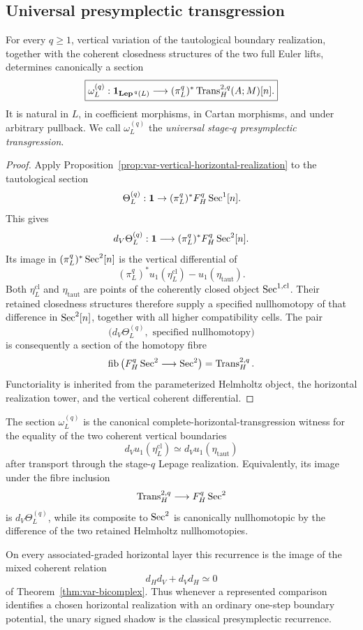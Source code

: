 \subsection{Universal presymplectic transgression}

\begin{theorem}
\label{thm:var-universal-presymplectic}
For every \(q\ge1\), vertical variation of the tautological boundary realization, together with the coherent closedness structures of the two full Euler lifts, determines canonically a section
\[
    \boxed{
    \omega_L^{(q)}:
    \mathbf 1_{\mathbf{Lep}^{\,q}(L)}
    \longrightarrow
    (\pi_L^q)^*\operatorname{Trans}_{H}^{2,q}(A;M)[n].
    }
\]
It is natural in \(L\), in coefficient morphisms, in Cartan morphisms, and under arbitrary pullback.  We call \(\omega_L^{(q)}\) the \emph{universal stage-\(q\) presymplectic transgression}.
\end{theorem}

\begin{proof}
Apply Proposition~\ref{prop:var-vertical-horizontal-realization} to the tautological section
\[
    \Theta_L^{(q)}:
    \mathbf 1\to
    (\pi_L^q)^*F_H^q\operatorname{Sec}^1[n].
\]
This gives
\[
    d_V\Theta_L^{(q)}:
    \mathbf 1\longrightarrow
    (\pi_L^q)^*F_H^q\operatorname{Sec}^2[n].
\]
Its image in \((\pi_L^q)^*\operatorname{Sec}^2[n]\) is the vertical differential of
\[
    (\pi_L^q)^*u_1(\eta_L^{\mathrm{cl}})
    -
    u_1(\eta_{\mathrm{taut}}).
\]
Both \(\eta_L^{\mathrm{cl}}\) and \(\eta_{\mathrm{taut}}\) are points of the coherently closed object \(\operatorname{Sec}^{1,\mathrm{cl}}\).  Their retained closedness structures therefore supply a specified nullhomotopy of that difference in \(\operatorname{Sec}^2[n]\), together with all higher compatibility cells.  The pair
\[
    \bigl(d_V\Theta_L^{(q)},\text{ specified nullhomotopy}\bigr)
\]
is consequently a section of the homotopy fibre
\[
    \operatorname{fib}\left(
      F_H^q\operatorname{Sec}^2\longrightarrow\operatorname{Sec}^2
    \right)
    =
    \operatorname{Trans}_{H}^{2,q}.
\]
Functoriality is inherited from the parameterized Helmholtz object, the horizontal realization tower, and the vertical coherent differential.
\end{proof}

\begin{theorem}
\label{thm:var-presymplectic-recurrence}
The section \(\omega_L^{(q)}\) is the canonical complete-horizontal-transgression witness for the equality of the two coherent vertical boundaries
\[
    d_Vu_1(\eta_L^{\mathrm{cl}})
    \simeq
    d_Vu_1(\eta_{\mathrm{taut}})
\]
after transport through the stage-\(q\) Lepage realization.  Equivalently, its image under the fibre inclusion
\[
    \operatorname{Trans}_{H}^{2,q}\longrightarrow F_H^q\operatorname{Sec}^2
\]
is \(d_V\Theta_L^{(q)}\), while its composite to \(\operatorname{Sec}^2\) is canonically nullhomotopic by the difference of the two retained Helmholtz nullhomotopies.

On every associated-graded horizontal layer this recurrence is the image of the mixed coherent relation
\[
    d_Hd_V+d_Vd_H\simeq0
\]
of Theorem~\ref{thm:var-bicomplex}.  Thus whenever a represented comparison identifies a chosen horizontal realization with an ordinary one-step boundary potential, the unary signed shadow is the classical presymplectic recurrence.
\end{theorem}

